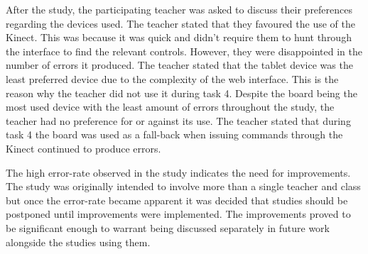 \documentclass[manuscript, review, screen]{acmart}
\begin{document}
After the study, the participating teacher was asked to discuss their preferences regarding the devices used.
The teacher stated that they favoured the use of the Kinect.
This was because it was quick and didn't require them to hunt through the interface to find the relevant controls.
However, they were disappointed in the number of errors it produced.
The teacher stated that the tablet device was the least preferred device due to the complexity of the web interface.
This is the reason why the teacher did not use it during task 4.
Despite the board being the most used device with the least amount of errors throughout the study, the teacher had no preference for or against its use.
The teacher stated that during task 4 the board was used as a fall-back when issuing commands through the Kinect continued to produce errors.

The high error-rate observed in the study indicates the need for improvements.
The study was originally intended to involve more than a single teacher and class but once the error-rate became apparent it was decided that studies should be postponed until improvements were implemented.
The improvements proved to be significant enough to warrant being discussed separately in future work alongside the studies using them.



\end{document}
